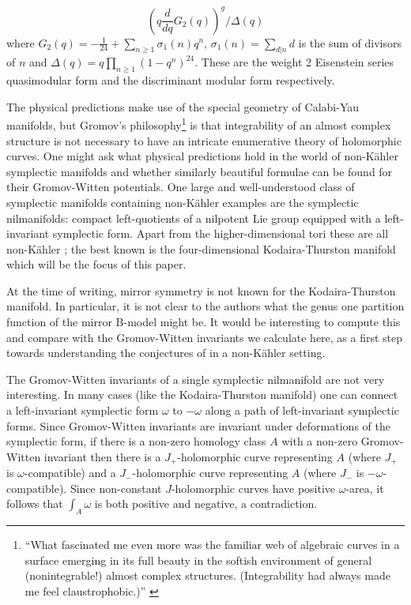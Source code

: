 \documentclass[11pt]{amsart}
\numberwithin{equation}{section}
\theoremstyle{definition}
\theoremstyle{remark}
\begin{document}
\[\left(q\frac{d}{dq}G_2(q)\right)^g/\Delta(q)\]
where $G_2(q)=-\frac{1}{24}+\sum_{n\geq 1}\sigma_1(n)q^n$, $\sigma_1(n)=\sum_{d|n}d$ is the sum of divisors of $n$ and $\Delta(q)=q\prod_{n\geq 1}(1-q^n)^{24}$. These are the weight 2 Eisenstein series quasimodular form and the discriminant modular form respectively.

The physical predictions make use of the special geometry of Calabi-Yau manifolds, but Gromov's philosophy\footnote{``What fascinated me even more was the familiar web of algebraic curves in a surface emerging in its full beauty in the softish environment of general (nonintegrable!) almost complex structures. (Integrability had always made me feel claustrophobic.)'' \cite{GromAMS}} is that integrability of an almost complex structure is not necessary to have an intricate enumerative theory of holomorphic curves. One might ask what physical predictions hold in the world of non-K\"{a}hler symplectic manifolds and whether similarly beautiful formulae can be found for their Gromov-Witten potentials. One large and well-understood class of symplectic manifolds containing non-K\"{a}hler examples are the symplectic nilmanifolds: compact left-quotients of a nilpotent Lie group equipped with a left-invariant symplectic form. Apart from the higher-dimensional tori these are all non-K\"{a}hler \cite{BG}; the best known is the four-dimensional Kodaira-Thurston manifold \cite{Th} which will be the focus of this paper.

At the time of writing, mirror symmetry is not known for the Kodaira-Thurston manifold. In particular, it is not clear to the authors what the genus one partition function of the mirror B-model might be. It would be interesting to compute this and compare with the Gromov-Witten invariants we calculate here, as a first step towards understanding the conjectures of \cite{BCOV} in a non-K\"{a}hler setting.

The Gromov-Witten invariants of a single symplectic nilmanifold are not very interesting. In many cases (like the Kodaira-Thurston manifold) one can connect a left-invariant symplectic form $\omega$ to $-\omega$ along a path of left-invariant symplectic forms. Since Gromov-Witten invariants are invariant under deformations of the symplectic form, if there is a non-zero homology class $A$ with a non-zero Gromov-Witten invariant then there is a $J_+$-holomorphic curve representing $A$ (where $J_+$ is $\omega$-compatible) and a $J_-$-holomorphic curve representing $A$ (where $J_-$ is $-\omega$-compatible). Since non-constant $J$-holomorphic curves have positive $\omega$-area, it follows that $\int_{A}\omega$ is both positive and negative, a contradiction.
\end{document}
